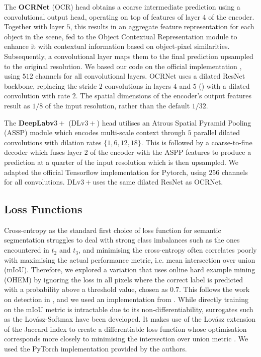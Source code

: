 \documentclass[runningheads]{llncs}
\newcommand{\dvp}{DLv$3+$}
\newcommand{\lov}{Lov\'{a}sz}
\newcommand{\tbf}[1]{\textbf{#1}}
\newcommand{\ta}[1]{\textbf{$t_{#1}$}}
\begin{document}
The \tbf{OCRNet} (OCR) head \cite{OCR} obtains a coarse intermediate prediction using a convolutional output head, operating on top of features of layer $4$ of the encoder. Together with layer $5$, this results in an aggregate feature representation for each object in the scene, fed to the Object Contextual Representation module to enhance it with contextual information based on object-pixel similarities. Subsequently, a convolutional layer maps them to the final prediction upsampled to the original resolution. We based our code on the official implementation \cite{OCR}, using $512$ channels for all convolutional layers. OCRNet uses a dilated ResNet backbone, replacing the stride $2$ convolutions in layers $4$ and $5$ (\cite{ResNet}) with a dilated convolution with rate $2$. The spatial dimensions of the encoder's output features result as $1/8$ of the input resolution, rather than the default $1/32$.

The \tbf{DeepLabv$3+$} (\dvp{}) head \cite{Deeplabv3plus} utilises an Atrous Spatial Pyramid Pooling (ASSP) module which encodes multi-scale context through $5$ parallel dilated convolutions with dilation rates $\{1, 6, 12, 18\}$. This is followed by a coarse-to-fine decoder which fuses layer $2$ of the encoder with the ASPP features to produce a prediction at a quarter of the input resolution which is then upsampled. We adapted the official Tensorflow implementation \cite{Deeplabv3plus} for Pytorch, using $256$ channels for all convolutions. \dvp uses the same dilated ResNet as OCRNet.

\subsection{Loss Functions}\label{methods:loss}
Cross-entropy as the standard first choice of loss function for semantic segmentation struggles to deal with strong class imbalances such as the ones encountered in \ta2 and \ta3, and minimising the cross-entropy often correlates poorly with maximising the actual performance metric, i.e. mean intersection over union (mIoU). Therefore, we explored a variation that uses online hard example mining (OHEM) \cite{ohem} by ignoring the loss in all pixels where the correct label is predicted with a probability above a threshold value, chosen as $0.7$. This follows the work on detection in \cite{ohem}, and we used an implementation from \cite{ohem_code}. While directly training on the mIoU metric is intractable due to its non-differentiability, surrogates such as the \lov{}-Softmax have been developed. It makes use of the \lov{} extension of the Jaccard index to create a differentiable loss function whose optimisation corresponds more closely to minimising the intersection over union metric \cite{Lovasz}. We used the PyTorch implementation provided by the authors.
\end{document}
